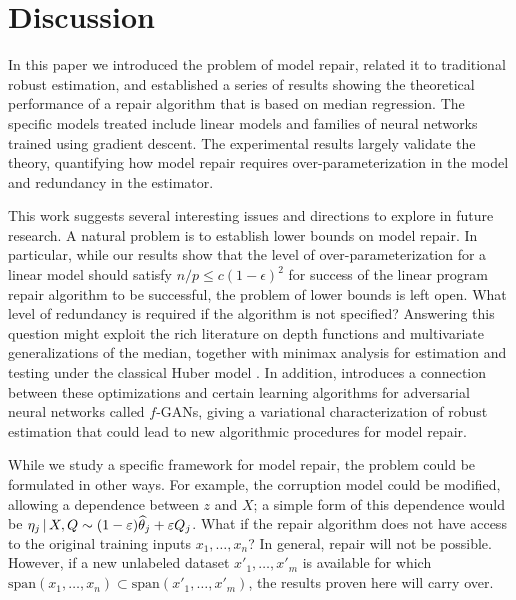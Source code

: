
\def\ones{{\mathds{1}}}

\section{Discussion}
\label{sec:discuss}

In this paper we introduced the problem of model repair, related it to traditional robust estimation, and established a series of results showing the theoretical performance of a repair algorithm that is based on median regression. The specific models treated include linear models and families of neural networks trained using gradient descent. The experimental results largely validate the theory, quantifying how model repair requires over-parameterization in the model and redundancy in the estimator.

This work suggests several interesting issues and directions to explore in future research.  A natural problem is to establish lower bounds on model repair. In particular, while our results show that the level of over-parameterization for a linear model should satisfy $n/p \leq c (1-\epsilon)^2$ for success of the linear program repair algorithm to be successful, the problem of lower bounds is left open. What level of redundancy is required if the algorithm is not specified? Answering this question might exploit the rich literature on depth functions and multivariate generalizations of the median, together with minimax analysis for estimation and testing under the classical Huber model \citep{chaodepth,diakonikolas,diakonikolas:2017,gao2018robust}. In addition,
\cite{gao2018robust} introduces a connection between these optimizations and certain learning algorithms for adversarial neural networks called $f$-GANs, giving a variational characterization of robust estimation that could lead to new algorithmic procedures for model repair.

While we study a specific
framework for model repair, the problem could be formulated in other ways.  For example,
the corruption model could be modified, allowing a dependence between $z$ and $X$;
a simple form of this dependence would be $\eta_j \,|\, X, Q \sim (1-\varepsilon) \widehat\theta_j + \varepsilon Q_j$.
What if the repair algorithm does not have access to the original training inputs $x_1,\ldots, x_n$?
In general, repair will not be possible. However, if a new unlabeled dataset $x'_1,\ldots, x'_{m}$
is available for which $\text{span}(x_1,\ldots,x_n) \subset \text{span}(x'_1,\ldots,x'_{m})$,
the results proven here will carry over.

